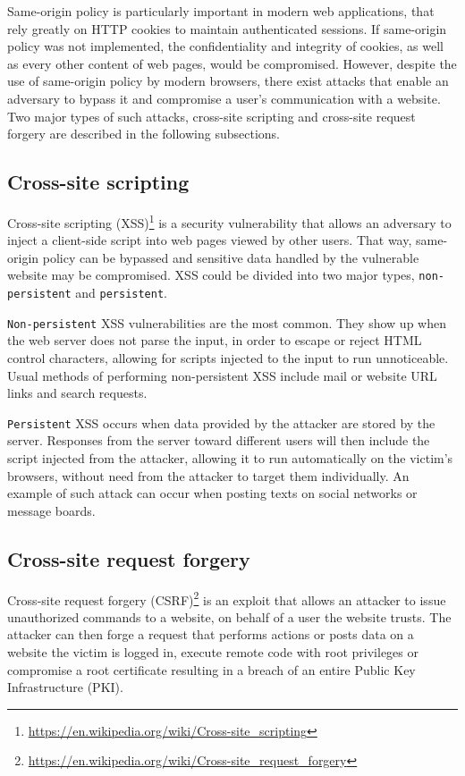 Same-origin policy is particularly important in modern web applications, that
rely greatly on HTTP cookies to maintain authenticated sessions. If same-origin
policy was not implemented, the confidentiality and integrity of cookies, as
well as every other content of web pages, would be compromised. However,
despite the use of same-origin policy by modern browsers, there exist attacks
that enable an adversary to bypass it and compromise a user's communication with
a website. Two major types of such attacks, cross-site scripting and cross-site
request forgery are described in the following subsections.

\subsection{Cross-site scripting}

Cross-site scripting
(XSS)\footnote{\url{https://en.wikipedia.org/wiki/Cross-site_scripting}} is a
security vulnerability that allows an adversary to inject a client-side script
into web pages viewed by other users. That way, same-origin policy can be
bypassed and sensitive data handled by the vulnerable website may be
compromised. XSS could be divided into two major types, \texttt{non-persistent}
and \texttt{persistent}.

\texttt{Non-persistent} XSS vulnerabilities are the most common. They show up
when the web server does not parse the input, in order to escape or reject HTML
control characters, allowing for scripts injected to the input to run
unnoticeable. Usual methods of performing non-persistent XSS include mail or
website URL links and search requests.

\texttt{Persistent} XSS occurs when data provided by the attacker are stored by
the server. Responses from the server toward different users will then include
the script injected from the attacker, allowing it to run automatically on the
victim's browsers, without need from the attacker to target them individually.
An example of such attack can occur when posting texts on social networks or
message boards.

\subsection{Cross-site request forgery}

Cross-site request forgery
(CSRF)\footnote{\url{https://en.wikipedia.org/wiki/Cross-site_request_forgery}}
is an exploit that allows an attacker to issue unauthorized commands to a
website, on behalf of a user the website trusts. The attacker can then forge a
request that performs actions or posts data on a website the victim is logged
in, execute remote code with root privileges or compromise a root certificate
resulting in a breach of an entire Public Key Infrastructure (PKI).

